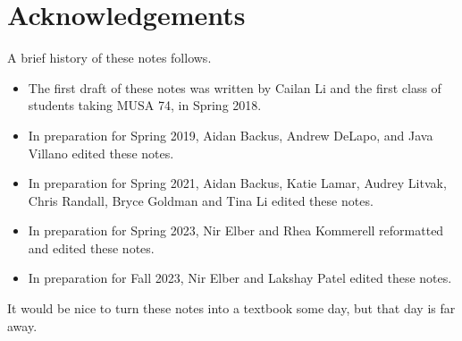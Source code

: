 \documentclass[../notes.tex]{subfiles}
\begin{document}
\section{Acknowledgements}
A brief history of these notes follows.
\begin{itemize}
    \item The first draft of these notes was written by Cailan Li and the first class of students taking MUSA 74, in Spring 2018.
    \item In preparation for Spring 2019, Aidan Backus, Andrew DeLapo, and Java Villano edited these notes.
    \item In preparation for Spring 2021, Aidan Backus, Katie Lamar, Audrey Litvak, Chris Randall, Bryce Goldman and Tina Li edited these notes.
    \item In preparation for Spring 2023, Nir Elber and Rhea Kommerell reformatted and edited these notes.
    \item In preparation for Fall 2023, Nir Elber and Lakshay Patel edited these notes.
\end{itemize}
It would be nice to turn these notes into a textbook some day, but that day is far away.
\end{document}
